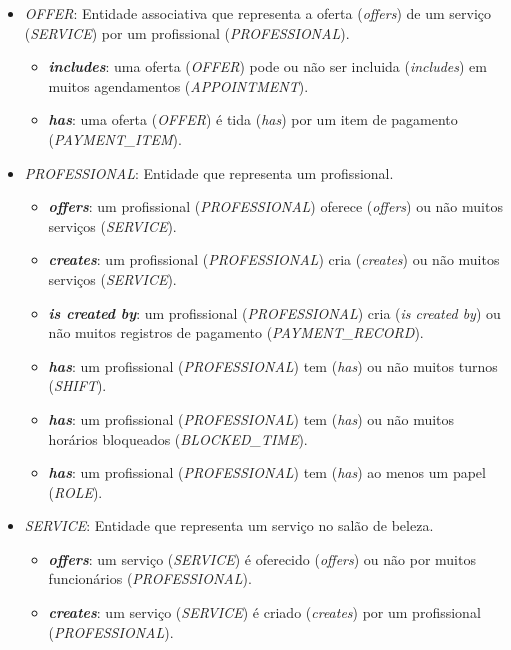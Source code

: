 \begin{itemize}
\begin{itemize}
	\end{itemize}
	\item \emph{OFFER}: Entidade associativa que representa a oferta (\textit{offers}) de um serviço (\emph{SERVICE}) por um profissional (\emph{PROFESSIONAL}).
	\begin{itemize}
		\item \textbf{\textit{includes}}: uma oferta (\emph{OFFER}) pode ou não ser incluida (\textit{includes}) em muitos agendamentos (\emph{APPOINTMENT}). 
		\item \textbf{\textit{has}}: uma oferta (\emph{OFFER}) é tida (\textit{has}) por um item de pagamento (\emph{PAYMENT\_ITEM}). 
	\end{itemize}
	\item \emph{PROFESSIONAL}: Entidade que representa um profissional.
	\begin{itemize}
		\item \textbf{\textit{offers}}: um profissional (\emph{PROFESSIONAL}) oferece (\textit{offers}) ou não muitos serviços (\emph{SERVICE}).
		\item \textbf{\textit{creates}}: um profissional (\emph{PROFESSIONAL}) cria (\textit{creates}) ou não muitos serviços (\emph{SERVICE}).
		\item \textbf{\textit{is created by}}: um profissional (\emph{PROFESSIONAL}) cria (\textit{is created by}) ou não muitos registros de pagamento (\emph{PAYMENT\_RECORD}).
		\item \textbf{\textit{has}}: um profissional (\emph{PROFESSIONAL}) tem (\textit{has}) ou não muitos turnos (\emph{SHIFT}).
		\item \textbf{\textit{has}}: um profissional (\emph{PROFESSIONAL}) tem (\textit{has}) ou não muitos horários bloqueados (\emph{BLOCKED\_TIME}).
		\item \textbf{\textit{has}}: um profissional (\emph{PROFESSIONAL}) tem (\textit{has}) ao menos um papel (\emph{ROLE}).
	\end{itemize}
	\item \emph{SERVICE}: Entidade que representa um serviço no salão de beleza.
	\begin{itemize}
		\item \textbf{\textit{offers}}: um serviço (\emph{SERVICE}) é oferecido (\textit{offers}) ou não por muitos funcionários (\emph{PROFESSIONAL}).
		\item \textbf{\textit{creates}}: um serviço (\emph{SERVICE}) é criado (\textit{creates}) por um profissional (\emph{PROFESSIONAL}).
	\end{itemize}

\end{itemize}
